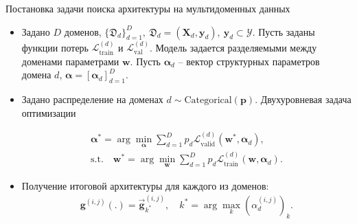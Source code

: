 \documentclass[aspectratio=169]{beamer}
\def\bw{\mathbf{w}}
\def\balpha{\boldsymbol{\alpha}}
\begin{document}
\begin{frame}{Постановка задачи поиска архитектуры на мультидоменных данных}
  \begin{itemize}
    \item 
    Задано $D$ доменов, $\{\mathfrak{D}_d\}_{d=1}^D, ~\mathfrak{D}_d = (\mathbf{X}_d, \mathbf{y}_d),
    ~\mathbf{y}_d \subset \mathcal{Y}$.
    Пусть заданы функции потерь $\mathcal{L}_\text{train}^{(d)}$ и $\mathcal{L}_\text{val}^{(d)}$.
    Модель задается разделяемыми между доменами параметрами $\bw$. Пусть $\balpha_d$ -- вектор
    структурных параметров домена $d$, $\balpha = [\balpha_d]_{d=1}^D$.
    \item Задано распределение на доменах $d \sim \mathrm{Categorical}(\mathbf{p})$.
    Двухуровневая задача оптимизации

    \begin{align*}
      \boldsymbol\alpha^* = \arg\min_{\boldsymbol\alpha}
      \sum_{d=1}^Dp_d\mathcal{L}_\text{valid}^{(d)}(\mathbf{w}^*,\boldsymbol\alpha_d),\\
      \mathrm{s.t.} \quad \mathbf{w}^* = \arg\min_{\mathbf{w}}\sum_{d=1}^D
      p_d\mathcal{L}_\text{train}^{(d)}(\mathbf{w}, \boldsymbol\alpha_d).
    \end{align*}

    \item Получение итоговой архитектуры для каждого из доменов:
    \begin{align*}
      \mathbf{g}^{(i, j)}(.) = \vec{\mathbf{g}}^{(i, j)}_{k^*}, \quad k^* = \arg\max_k (\alpha^{(i, j)}_d)_k.
    \end{align*}
    

    \end{itemize}
\end{frame}
\end{document}
